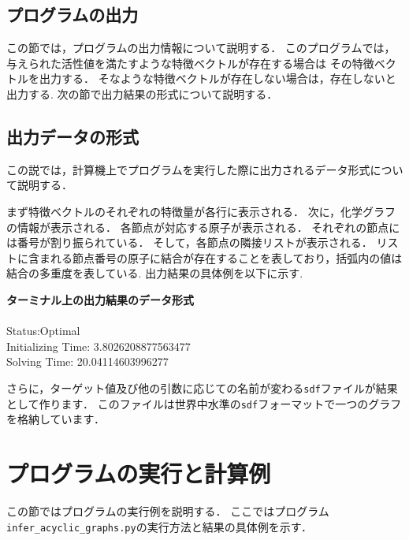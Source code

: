 \documentclass[11pt,titlepage,dvipdfmx,twoside]{jarticle}
\begin{document}
\bigskip



\subsection{プログラムの出力}
\label{sec:section3_3}

この節では，プログラムの出力情報について説明する．
このプログラムでは，与えられた活性値を満たすような特徴ベクトルが存在する場合は
その特徴ベクトルを出力する．
そなような特徴ベクトルが存在しない場合は，存在しないと出力する.
次の節で出力結果の形式について説明する．

\subsection{出力データの形式}
\label{sec:section3_4}

この説では，計算機上でプログラムを実行した際に出力されるデータ形式について説明する．


まず特徴ベクトルのそれぞれの特徴量が各行に表示される．
次に，化学グラフの情報が表示される．
各節点が対応する原子が表示される．
それぞれの節点には番号が割り振られている．
そして，各節点の隣接リストが表示される．
リストに含まれる節点番号の原子に結合が存在することを表しており，括弧内の値は結合の多重度を表している.
出力結果の具体例を以下に示す.

\bigskip

\begin{oframed}
{\bf ターミナル上の出力結果のデータ形式}\\\\
Status:Optimal \\ 
Initializing Time: 3.8026208877563477 \\ 
Solving Time: 20.04114603996277

\end{oframed}

さらに，ターゲット値及び他の引数に応じての名前が変わる{\tt sdf}ファイルが結果として作ります．
このファイルは世界中水準の{\tt sdf}フォーマットで一つのグラフを格納しています．



\section{プログラムの実行と計算例}
\label{sec:Exp}

この節ではプログラムの実行例を説明する．
ここではプログラム{\tt infer\_acyclic\_graphs.py}の実行方法と結果の具体例を示す．
\end{document}
